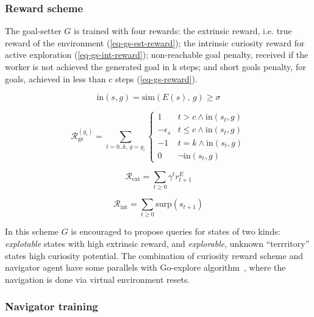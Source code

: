 \documentclass[acmsmall, nonacm]{acmart}
\begin{document}
\subsubsection{Reward scheme}

The goal-setter $G$ is trained with four rewards: the extrinsic reward, i.e. true reward of the environment (\ref{eq-gs-est-reward}); the intrinsic curiosity reward for active exploration (\ref{eq-gs-int-reward}); non-reachable goal penalty, received if the worker is not achieved the generated goal in k steps; and short goals penalty, for goals, achieved in less than c steps (\ref{eq-gs-reward}).

\begin{equation}
\mathrm{in}(s, g) = \mathrm{sim}(E(s),\, g) \ge \sigma
\end{equation}

\begin{equation} \label{eq-gs-reward}
\mathcal{R}_\mathrm{gs}^{(g_i)} = \sum_{t=0..k,\, g=g_i}
\begin{cases}
1 & t > c \land \mathrm{in}(s_t, g) \\
-\epsilon_s & t \le c \land \mathrm{in}(s_t, g) \\
-1 & t=k \land \mathrm{in}(s_t, g) \\
0 & \lnot \mathrm{in}(s_t, g)
\end{cases}
\end{equation}

\begin{equation} \label{eq-gs-est-reward}
\mathcal{R}_\mathrm{ext} = 
\sum_{t \geq 0} \gamma^t r^E_{t+1}
\end{equation}

\begin{equation} \label{eq-gs-int-reward}
\mathcal{R}_\mathrm{int} = 
\sum_{t \ge 0}  \mathrm{surp}(s_{t+1})
\end{equation}

In this scheme $G$ is encouraged to propose queries for states of two kinds: \emph{explotable} states with high extrinsic reward, and \emph{explorable}, unknown ``terrritory'' states high curiosity potential.
%
The combination of curiosity reward scheme and navigator agent have some parallels with Go-explore algorithm~\citep{ecoffet_first_2021}, where the navigation is done via virtual environment resets.

\subsubsection{Navigator training}
\end{document}

